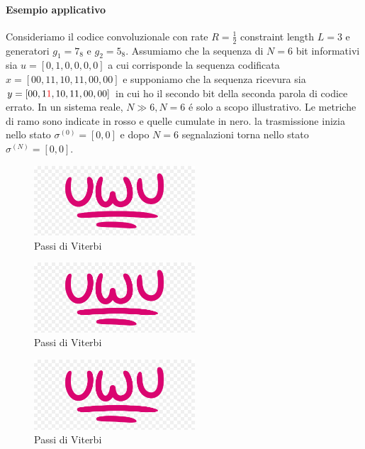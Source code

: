             \paragraph{Esempio applicativo}
            Consideriamo il codice convoluzionale con rate $R=\frac{1}{2}$ constraint length $L=3$ e generatori $g_1=7_8$ e $g_2=5_8$.
            Assumiamo che la sequenza di $N=6$ bit informativi sia $u = [0,1,0,0,0,0]$ a cui corrisponde la sequenza codificata 
            $x = [00,11,10,11,00,00]$ e supponiamo che la sequenza ricevura sia $y = [00,1{\color{red}1},10,11,00,00]$ in cui ho il secondo bit 
            della seconda parola di codice errato. In un sistema reale, $N\gg 6, N= 6$ é solo a scopo illustrativo.
            Le metriche di ramo sono indicate in rosso e quelle cumulate in nero. la trasmissione inizia nello stato $\sigma^{(0)}=[0,0]$ e
            dopo $N=6$ segnalazioni torna nello stato $\sigma^{(N)}=[0,0]$.
            \begin{figure}[H]
                \centering
                \includegraphics[width = 6cm]{media/uwu.png}
                \caption{Passi di Viterbi}
            \end{figure}
            \begin{figure}[H]
                \centering
                \includegraphics[width = 6cm]{media/uwu.png}
                \caption{Passi di Viterbi}
            \end{figure}
            \begin{figure}[H]
                \centering
                \includegraphics[width = 6cm]{media/uwu.png}
                \caption{Passi di Viterbi}
            \end{figure}
